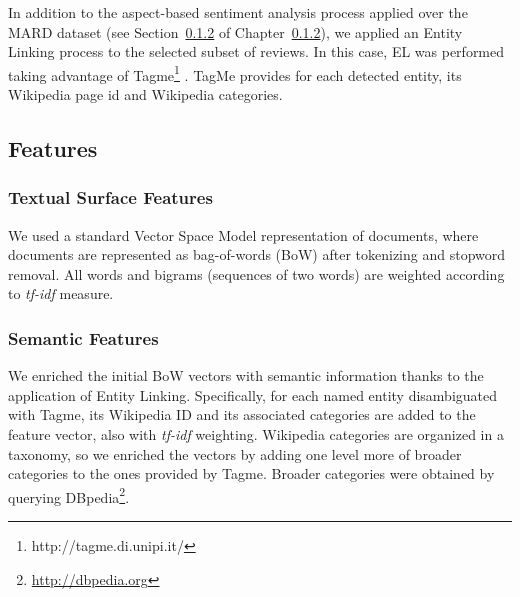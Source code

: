 In addition to the aspect-based sentiment analysis process applied over the MARD dataset (see Section~\ref{} of Chapter~\ref{}), we applied an Entity Linking process to the selected subset of reviews. In this case, EL was performed taking advantage of Tagme\footnote{http://tagme.di.unipi.it/} \cite{Ferragina2012}. TagMe provides for each detected entity, its Wikipedia page id and Wikipedia categories.

\subsection{Features}
\label{sec:similarity:features}
\subsubsection{Textual Surface Features}
We used a standard Vector Space Model representation of documents, where documents are represented as bag-of-words (BoW) after tokenizing and stopword removal. All words and bigrams (sequences of two words) are weighted according to \textit{tf-idf} measure. 

\subsubsection{Semantic Features}

We enriched the initial BoW vectors with semantic information thanks to the application of Entity Linking. Specifically, for each named entity disambiguated with Tagme, its Wikipedia ID and its associated categories are added to the feature vector, also with \textit{tf-idf} weighting. Wikipedia categories are organized in a taxonomy, so we enriched the vectors by adding one level more of broader categories to the ones provided by Tagme. Broader categories were obtained by querying DBpedia\footnote{\url{http://dbpedia.org}}.


